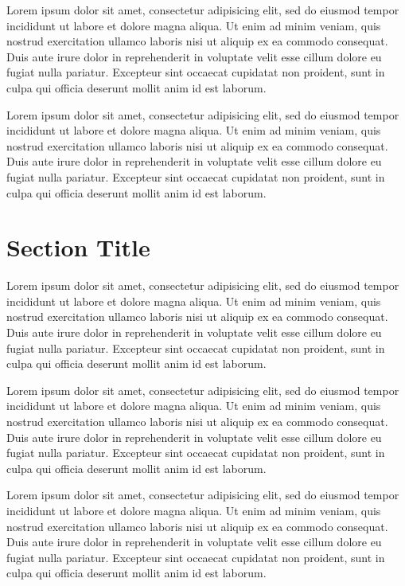 Lorem ipsum dolor sit amet, consectetur adipisicing elit, sed do eiusmod tempor incididunt ut labore et dolore magna aliqua. Ut enim ad minim veniam, quis nostrud exercitation ullamco laboris nisi ut aliquip ex ea commodo consequat. Duis aute irure dolor in reprehenderit in voluptate velit esse cillum dolore eu fugiat nulla pariatur. Excepteur sint occaecat cupidatat non proident, sunt in culpa qui officia deserunt mollit anim id est laborum.

Lorem ipsum dolor sit amet, consectetur adipisicing elit, sed do eiusmod tempor incididunt ut labore et dolore magna aliqua. Ut enim ad minim veniam, quis nostrud exercitation ullamco laboris nisi ut aliquip ex ea commodo consequat. Duis aute irure dolor in reprehenderit in voluptate velit esse cillum dolore eu fugiat nulla pariatur. Excepteur sint occaecat cupidatat non proident, sunt in culpa qui officia deserunt mollit anim id est laborum.

\section{Section Title}
Lorem ipsum dolor sit amet, consectetur adipisicing elit, sed do eiusmod tempor incididunt ut labore et dolore magna aliqua. Ut enim ad minim veniam, quis nostrud exercitation ullamco laboris nisi ut aliquip ex ea commodo consequat. Duis aute irure dolor in reprehenderit in voluptate velit esse cillum dolore eu fugiat nulla pariatur. Excepteur sint occaecat cupidatat non proident, sunt in culpa qui officia deserunt mollit anim id est laborum.

Lorem ipsum dolor sit amet, consectetur adipisicing elit, sed do eiusmod tempor incididunt ut labore et dolore magna aliqua. Ut enim ad minim veniam, quis nostrud exercitation ullamco laboris nisi ut aliquip ex ea commodo consequat. Duis aute irure dolor in reprehenderit in voluptate velit esse cillum dolore eu fugiat nulla pariatur. Excepteur sint occaecat cupidatat non proident, sunt in culpa qui officia deserunt mollit anim id est laborum.

Lorem ipsum dolor sit amet, consectetur adipisicing elit, sed do eiusmod tempor incididunt ut labore et dolore magna aliqua. Ut enim ad minim veniam, quis nostrud exercitation ullamco laboris nisi ut aliquip ex ea commodo consequat. Duis aute irure dolor in reprehenderit in voluptate velit esse cillum dolore eu fugiat nulla pariatur. Excepteur sint occaecat cupidatat non proident, sunt in culpa qui officia deserunt mollit anim id est laborum.

